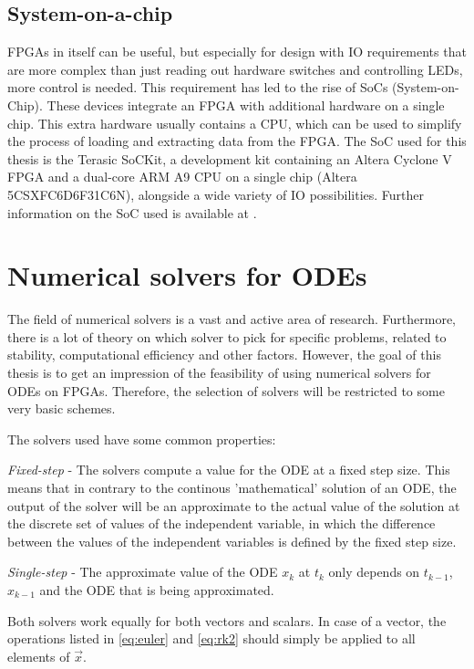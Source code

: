 \subsection{System-on-a-chip}
FPGAs in itself can be useful, but especially for design with IO requirements that are more complex than just reading out hardware switches and controlling LEDs, more control is needed. This requirement has led to the rise of SoCs (System-on-Chip). These devices integrate an FPGA with additional hardware on a single chip. This extra hardware usually contains a CPU, which can be used to simplify the process of loading and extracting data from the FPGA. The SoC used for this thesis is the Terasic SoCKit, a development kit containing an Altera Cyclone V FPGA and a dual-core ARM A9 CPU on a single chip (Altera 5CSXFC6D6F31C6N), alongside a wide variety of IO possibilities. Further information on the SoC used is available at \cite{SoCKit}.

\section{Numerical solvers for ODEs}
The field of numerical solvers is a vast and active area of research. Furthermore, there is a lot of theory on which solver to pick for specific problems, related to stability, computational efficiency and other factors. However, the goal of this thesis is to get an impression of the feasibility of using numerical solvers for ODEs on FPGAs. Therefore, the selection of solvers will be restricted to some very basic schemes. 

The solvers used have some common properties:
\begin{itemizens}
	\item \emph{Fixed-step} - The solvers compute a value for the ODE at a fixed step size. This means that in contrary to the continous 'mathematical' solution of an ODE, the output of the solver will be an approximate to the actual value of the solution at the discrete set of values of the independent variable, in which the difference between the values of the independent variables is defined by the fixed step size.
	\item \emph{Single-step} - The approximate value of the ODE $x_{k}$ at $t_{k}$ only depends on $t_{k-1}$, $x_{k-1}$ and the ODE that is being approximated.   
\end{itemizens}

Both solvers work equally for both vectors and scalars. In case of a vector, the operations listed in \ref{eq:euler} and \ref{eq:rk2} should simply be applied to all elements of $\vec{x}$.

